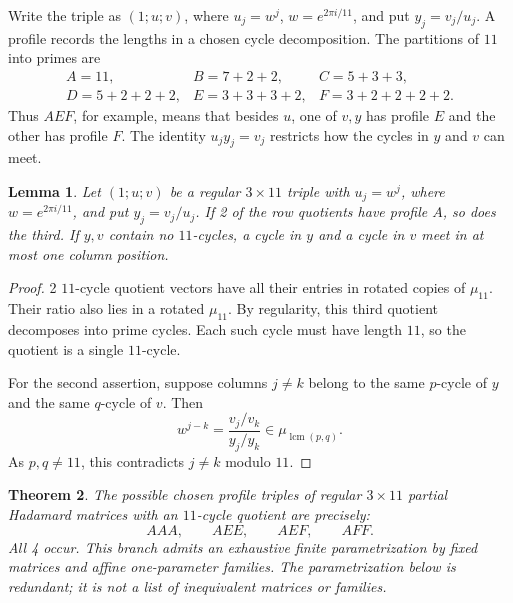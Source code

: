 \documentclass[11pt,a4paper]{article}
\newtheorem{theorem}{Theorem}[section]
\newtheorem{lemma}[theorem]{Lemma}
\numberwithin{equation}{section}
\begin{document}
Write the triple as $(1;u;v)$, where $u_j=w^j$, $w=e^{2\pi i/11}$, and put $y_j=v_j/u_j$. A profile records the lengths in a chosen cycle decomposition. The partitions of $11$ into primes are
\[
\begin{array}{lll}
 A=11,&B=7+2+2,&C=5+3+3,\\
 D=5+2+2+2,&E=3+3+3+2,&F=3+2+2+2+2.
\end{array}
\]
Thus $AEF$, for example, means that besides $u$, one of $v,y$ has profile $E$ and the other has profile $F$. The identity $u_jy_j=v_j$ restricts how the cycles in $y$ and $v$ can meet.

\begin{lemma}\label{n11_A_branch:overlap}
Let $(1;u;v)$ be a regular $3\times11$ triple with $u_j=w^j$, where $w=e^{2\pi i/11}$, and put $y_j=v_j/u_j$. If 2 of the row quotients have profile $A$, so does the third. If $y,v$ contain no $11$-cycles, a cycle in $y$ and a cycle in $v$ meet in at most one column position.
\end{lemma}

\begin{proof}
2 $11$-cycle quotient vectors have all their entries in rotated copies of $\mu_{11}$. Their ratio also lies in a rotated $\mu_{11}$. By regularity, this third quotient decomposes into prime cycles. Each such cycle must have length $11$, so the quotient is a single $11$-cycle.

For the second assertion, suppose columns $j\ne k$ belong to the same $p$-cycle of $y$ and the same $q$-cycle of $v$. Then
$$w^{j-k}=\frac{v_j/v_k}{y_j/y_k}\in\mu_{\operatorname{lcm}(p,q)}.$$
As $p,q\ne11$, this contradicts $j\ne k$ modulo $11$.
\end{proof}

\begin{theorem}\label{n11_A_branch:profiles}
The possible chosen profile triples of regular $3\times11$ partial Hadamard matrices with an $11$-cycle quotient are precisely:
$$AAA,\qquad AEE,\qquad AEF,\qquad AFF.$$
All 4 occur. This branch admits an exhaustive finite parametrization by fixed matrices and affine one-parameter families. The parametrization below is redundant; it is not a list of inequivalent matrices or families.
\end{theorem}
\end{document}
